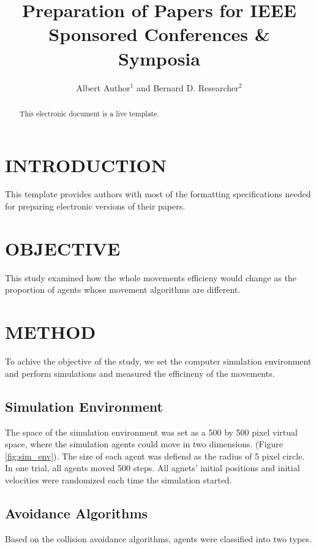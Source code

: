 \documentclass[letterpaper, 10 pt, conference]{ieeeconf}  %
\title{\LARGE \bf
Preparation of Papers for IEEE Sponsored Conferences \& Symposia
}
\author{Albert Author$^{1}$ and Bernard D. Researcher$^{2}$}
\begin{document}
\maketitle
\thispagestyle{empty}
\pagestyle{empty}


\begin{abstract}

This electronic document is a live template. 

\end{abstract}

\section{INTRODUCTION}
This template provides authors with most of the formatting specifications needed for preparing electronic versions of their papers. 

\section{OBJECTIVE}
This study examined how the whole movements efficieny would change as the proportion of agents whose movement algorithms are different. 

\section{METHOD}
To achive the objective of the study, we set the computer simulation environment and perform simulations and measured the efficineny of the movements.  

\subsection{Simulation Environment}
The space of the simulation environment was set as a 500 by 500 pixel virtual space, where the simulation agents could move in two dimensions. (Figure \ref{fig:sim_env}). The size of each agent was defiend as the radius of 5 pixel circle. In one trial, all agents moved 500 steps. All agnets' initial positions and initial velocities were randomized each time the simulation started.

\subsection{Avoidance Algorithms}
Based on the collision avoidance algorithms, agents were classified into two types.
\end{document}
